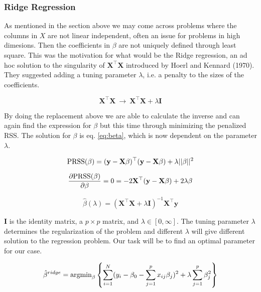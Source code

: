 \documentclass[a4paper,12pt, english]{article}
\begin{document}
\subsubsection{Ridge Regression}

As mentioned in the section above we may come across problems where the columns in $X$ are not linear independent, often an issue for problems in high dimesions. Then the coefficients in $\beta$ are not uniquely defined through least square. This was the motivation for what would be the Ridge regression, an ad hoc solution to the singularity of $\mathbf{X^{\top}}\mathbf{X}$ introduced by Hoerl and Kennard (1970).
They suggested adding a tuning parameter $\lambda$, i.e. a penalty to the sizes of the coefficients.

\begin{equation*}
\mathbf{X}^{\top}\mathbf{X} \ \rightarrow \ \mathbf{X}^{\top}\mathbf{X} + \lambda\mathbf{I}
\end{equation*}

By doing the replacement above we are able to calculate the inverse and can again find the expression for $\beta$ but this time through minimizing the penalized RSS. The solution for $\beta$ is eq. \ref{eq:beta}, which is now dependent on the parameter $\lambda$.

\begin{equation*}
\textnormal{PRSS}(\beta) = (\mathbf{y} - \mathbf{X}\beta)^{\top}(\mathbf{y} - \mathbf{X}\beta) + \lambda ||\beta||^2
\end{equation*}

\begin{equation*}
\frac{\partial \textnormal{PRSS}(\beta)}{\partial \beta} = 0 = -2 \mathbf{X}^{\top}(\mathbf{y} - \mathbf{X}\beta) + 2 \lambda \beta
\end{equation*}

\begin{equation*} 
\hat{\beta}(\lambda) = (\mathbf{X}^{\top}\mathbf{X} + \lambda\mathbf{I})^{-1}\mathbf{X}^{\top}\mathbf{y}
\end{equation*}

$\mathbf{I}$ is the identity matrix, a $p \times p$ matrix, and $\lambda \in [0, \infty]$. The tuning parameter $\lambda$ determines the regularization of the problem and different $\lambda$ will give different solution to the regression problem. Our task will be to find an optimal parameter for our case.

\begin{equation} \label{eq:b_ridge}
\hat{\beta}^{ridge} = \textnormal{argmin}_{\beta} \left \{ \sum_{i=1}^{N} (y_i - \beta_0 - \sum_{j=1}^{p} x_{ij} \beta_j)^2 + \lambda \sum_{j=1}^{p} \beta_j^2 \right \}
\end{equation}
\end{document}
